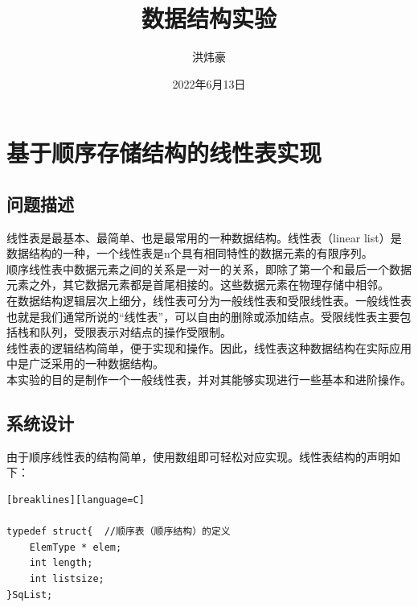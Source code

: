 \documentclass[supercite]{Experimental_Report}
\title{~~~~~~数据结构实验~~~~~~}
\author{洪炜豪}
\date{2022年6月13日}
\theoremstyle{definition}
\begin{document}
\begin{sloppypar}
\maketitle

\clearpage


\tableofcontents[level=2]
\clearpage


\section{基于顺序存储结构的线性表实现}

\subsection{问题描述}

线性表是最基本、最简单、也是最常用的一种数据结构。线性表（linear list）是数据结构的一种，一个线性表是n个具有相同特性的数据元素的有限序列。\\

顺序线性表中数据元素之间的关系是一对一的关系，即除了第一个和最后一个数据元素之外，其它数据元素都是首尾相接的。这些数据元素在物理存储中相邻。\\

在数据结构逻辑层次上细分，线性表可分为一般线性表和受限线性表。一般线性表也就是我们通常所说的“线性表”，可以自由的删除或添加结点。受限线性表主要包括栈和队列，受限表示对结点的操作受限制。\\

线性表的逻辑结构简单，便于实现和操作。因此，线性表这种数据结构在实际应用中是广泛采用的一种数据结构。\\

本实验的目的是制作一个一般线性表，并对其能够实现进行一些基本和进阶操作。\\

\subsection{系统设计}

由于顺序线性表的结构简单，使用数组即可轻松对应实现。线性表结构的声明如下：

\begin{lstlisting}[breaklines][breaklines][language=C]

typedef struct{  //顺序表（顺序结构）的定义
	ElemType * elem;
	int length;
	int listsize;
}SqList;


\end{lstlisting}
\end{sloppypar}
\end{document}
